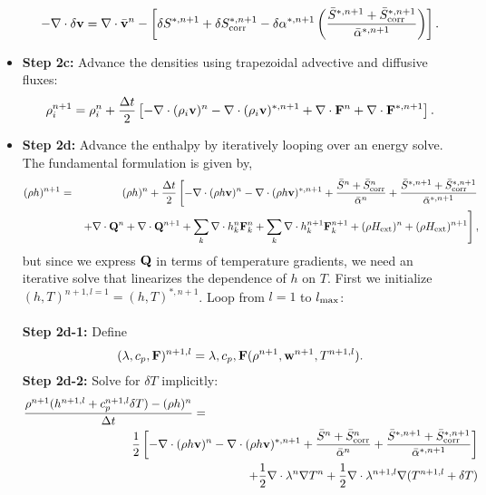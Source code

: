 \documentclass[final]{siamltex}
\def\Fb {{\bf F}}
\def\Qb {{\bf Q}}
\def\vb {{\bf v}}
\def\wb {{\bf w}}
\def\Hext {H_{\rm ext}}
\def\half   {\frac{1}{2}}
\begin{document}
\begin{itemize}
\begin{equation}
-\nabla\cdot\delta\vb = \nabla\cdot\bar{\vb}^n - \left[\delta S^{*,n+1} + \delta S_{\rm corr}^{*,n+1} - \delta\alpha^{*,n+1}\left(\frac{\bar{S}^{*,n+1} + \bar{S}_{\rm corr}^{*,n+1}}{\bar{\alpha}^{*,n+1}}\right)\right].
\end{equation}
\item {\bf Step 2c:} Advance the densities using trapezoidal advective and diffusive fluxes:
\begin{equation}
\rho_i^{n+1} = \rho_i^n + \frac{\Delta t}{2}\left[-\nabla\cdot(\rho_i\vb)^n -\nabla\cdot(\rho_i\vb)^{*,n+1} + \nabla\cdot\Fb^n + \nabla\cdot\Fb^{*,n+1}\right].
\end{equation}
\item {\bf Step 2d:} Advance the enthalpy by iteratively looping over an energy solve.  The fundamental formulation is given by,
\begin{eqnarray}
(\rho h)^{n+1} &=& (\rho h)^n + \frac{\Delta t}{2}\left[-\nabla\cdot(\rho h\vb)^n -\nabla\cdot(\rho h\vb)^{*,n+1} + \frac{\bar{S}^n + \bar{S}_{\rm corr}^n}{\bar{\alpha}^n} + \frac{\bar{S}^{*,n+1}+ \bar{S}_{\rm corr}^{*,n+1}}{\bar{\alpha}^{*,n+1}}\right.\nonumber\\
&&\left.+ \nabla\cdot\Qb^n + \nabla\cdot\Qb^{n+1} + \sum_k\nabla\cdot h_k^n\Fb_k^n + \sum_k\nabla\cdot h_k^{n+1}\Fb_k^{n+1} + (\rho\Hext)^n + (\rho\Hext)^{n+1}\right],\nonumber\\
\end{eqnarray}
but since we express $\Qb$ in terms of temperature gradients, we need an iterative solve that linearizes
the dependence of $h$ on $T$.  First we initialize $(h,T)^{n+1,l=1} = (h,T)^{*,n+1}$.
Loop from $l=1$ to $l_{\rm max}$:\\ \\
{\bf Step 2d-1:} Define
\begin{equation}
(\lambda,c_p,\Fb)^{n+1,l} = \lambda,c_p,\Fb(\rho^{n+1},\wb^{n+1},T^{n+1,l}).
\end{equation}
{\bf Step 2d-2:} Solve for $\delta T$ implicitly:
\begin{eqnarray}
\frac{\rho^{n+1}(h^{n+1,l} + c_p^{n+1,l}\delta T) - (\rho h)^n}{\Delta t} &=& \nonumber\\
&&\hspace{-1in}\half\left[-\nabla\cdot(\rho h\vb)^n - \nabla\cdot(\rho h\vb)^{*,n+1} + \frac{\bar{S}^n + \bar{S}_{\rm corr}^n}{\bar{\alpha}^n} + \frac{\bar{S}^{*,n+1}+ \bar{S}_{\rm corr}^{*,n+1}}{\bar{\alpha}^{*,n+1}}\right] \nonumber\\
&&\hspace{-1in} + \half\nabla\cdot\lambda^n\nabla T^n + \half\nabla\cdot\lambda^{n+1,l}\nabla(T^{n+1,l} + \delta T)\nonumber\\

\end{eqnarray}
\end{itemize}
\end{document}
